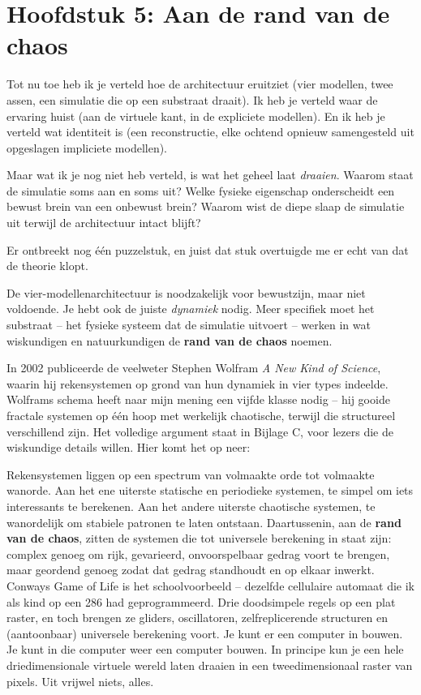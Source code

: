 \documentclass[11pt, twoside, openright]{book}
\begin{document}
\chapter*{Hoofdstuk 5: Aan de rand van de chaos}

Tot nu toe heb ik je verteld hoe de architectuur eruitziet (vier modellen, twee assen, een simulatie die op een substraat draait). Ik heb je verteld waar de ervaring huist (aan de virtuele kant, in de expliciete modellen). En ik heb je verteld wat identiteit is (een reconstructie, elke ochtend opnieuw samengesteld uit opgeslagen impliciete modellen).

Maar wat ik je nog niet heb verteld, is wat het geheel laat \textit{draaien}. Waarom staat de simulatie soms aan en soms uit? Welke fysieke eigenschap onderscheidt een bewust brein van een onbewust brein? Waarom wist de diepe slaap de simulatie uit terwijl de architectuur intact blijft?

Er ontbreekt nog één puzzelstuk, en juist dat stuk overtuigde me er echt van dat de theorie klopt.

De vier-modellenarchitectuur is noodzakelijk voor bewustzijn, maar niet voldoende. Je hebt ook de juiste \textit{dynamiek} nodig. Meer specifiek moet het substraat -- het fysieke systeem dat de simulatie uitvoert -- werken in wat wiskundigen en natuurkundigen de \textbf{rand van de chaos} noemen.

In 2002 publiceerde de veelweter Stephen Wolfram \textit{A New Kind of Science}, waarin hij rekensystemen op grond van hun dynamiek in vier types indeelde. Wolframs schema heeft naar mijn mening een vijfde klasse nodig -- hij gooide fractale systemen op één hoop met werkelijk chaotische, terwijl die structureel verschillend zijn. Het volledige argument staat in Bijlage C, voor lezers die de wiskundige details willen. Hier komt het op neer:

Rekensystemen liggen op een spectrum van volmaakte orde tot volmaakte wanorde. Aan het ene uiterste statische en periodieke systemen, te simpel om iets interessants te berekenen. Aan het andere uiterste chaotische systemen, te wanordelijk om stabiele patronen te laten ontstaan. Daartussenin, aan de \textbf{rand van de chaos}, zitten de systemen die tot universele berekening in staat zijn: complex genoeg om rijk, gevarieerd, onvoorspelbaar gedrag voort te brengen, maar geordend genoeg zodat dat gedrag standhoudt en op elkaar inwerkt. Conways Game of Life is het schoolvoorbeeld -- dezelfde cellulaire automaat die ik als kind op een 286 had geprogrammeerd. Drie doodsimpele regels op een plat raster, en toch brengen ze gliders, oscillatoren, zelfreplicerende structuren en (aantoonbaar) universele berekening voort. Je kunt er een computer in bouwen. Je kunt in die computer weer een computer bouwen. In principe kun je een hele driedimensionale virtuele wereld laten draaien in een tweedimensionaal raster van pixels. Uit vrijwel niets, alles.
\end{document}
